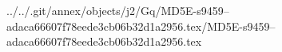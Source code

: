 ../../.git/annex/objects/j2/Gq/MD5E-s9459--adaca66607f78eede3cb06b32d1a2956.tex/MD5E-s9459--adaca66607f78eede3cb06b32d1a2956.tex